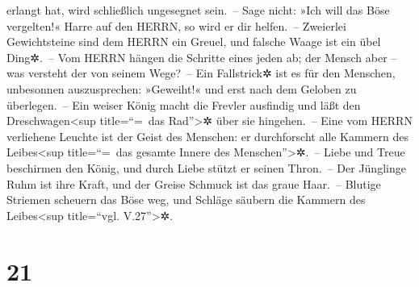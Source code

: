 erlangt hat, wird schließlich ungesegnet sein.~-- Sage
nicht: »Ich will das Böse vergelten!« Harre auf den HERRN, so wird er
dir helfen.~-- Zweierlei Gewichtsteine sind dem HERRN ein
Greuel, und falsche Waage ist ein übel Ding✲.~-- Vom
HERRN hängen die Schritte eines jeden ab; der Mensch aber -- was
versteht der von seinem Wege?~-- Ein Fallstrick✲ ist es
für den Menschen, unbesonnen auszusprechen: »Geweiht!« und erst nach dem
Geloben zu überlegen.~-- Ein weiser König macht die
Frevler ausfindig und läßt den Dreschwagen\textless sup title=``=~das
Rad''\textgreater✲ über sie hingehen.~-- Eine vom HERRN
verliehene Leuchte ist der Geist des Menschen: er durchforscht alle
Kammern des Leibes\textless sup title=``=~das gesamte Innere des
Menschen''\textgreater✲.~-- Liebe und Treue beschirmen
den König, und durch Liebe stützt er seinen Thron.~-- Der
Jünglinge Ruhm ist ihre Kraft, und der Greise Schmuck ist das graue
Haar.~-- Blutige Striemen scheuern das Böse weg, und
Schläge säubern die Kammern des Leibes\textless sup title=``vgl.
V.27''\textgreater✲.

\hypertarget{section-20}{%
\section{21}\label{section-20}}

